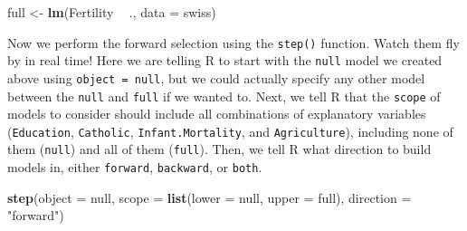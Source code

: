 \documentclass[
]{book}
\newenvironment{Shaded}{\begin{snugshade}}{\end{snugshade}}
\newcommand{\DataTypeTok}[1]{\textcolor[rgb]{0.13,0.29,0.53}{#1}}
\newcommand{\KeywordTok}[1]{\textcolor[rgb]{0.13,0.29,0.53}{\textbf{#1}}}
\newcommand{\NormalTok}[1]{#1}
\newcommand{\OperatorTok}[1]{\textcolor[rgb]{0.81,0.36,0.00}{\textbf{#1}}}
\newcommand{\StringTok}[1]{\textcolor[rgb]{0.31,0.60,0.02}{#1}}
\begin{document}
\begin{Shaded}
\begin{Highlighting}[]
\NormalTok{full <-}\StringTok{ }\KeywordTok{lm}\NormalTok{(Fertility }\OperatorTok{~}\StringTok{ }\NormalTok{., }\DataTypeTok{data =}\NormalTok{ swiss)}
\end{Highlighting}
\end{Shaded}

Now we perform the forward selection using the \texttt{step()} function. Watch them fly by in real time! Here we are telling R to start with the \texttt{null} model we created above using \texttt{object\ =\ null}, but we could actually specify any other model between the \texttt{null} and \texttt{full} if we wanted to. Next, we tell R that the \texttt{scope} of models to consider should include all combinations of explanatory variables (\texttt{Education}, \texttt{Catholic}, \texttt{Infant.Mortality}, and \texttt{Agriculture}), including none of them (\texttt{null}) and all of them (\texttt{full}). Then, we tell R what direction to build models in, either \texttt{forward}, \texttt{backward}, or \texttt{both}.

\begin{Shaded}
\begin{Highlighting}[]
\KeywordTok{step}\NormalTok{(}\DataTypeTok{object =}\NormalTok{ null, }\DataTypeTok{scope =} \KeywordTok{list}\NormalTok{(}\DataTypeTok{lower =}\NormalTok{ null, }\DataTypeTok{upper =}\NormalTok{ full), }\DataTypeTok{direction =} \StringTok{"forward"}\NormalTok{)}
\end{Highlighting}
\end{Shaded}
\end{document}
